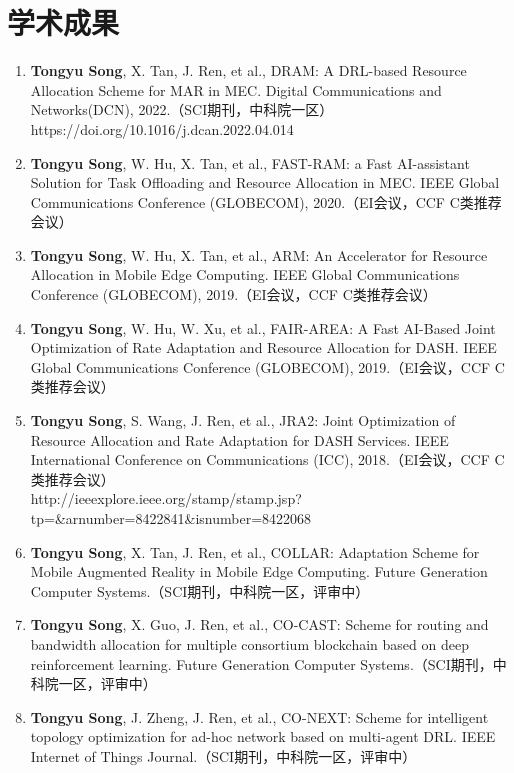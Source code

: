 \documentclass{resume}
\begin{document}
\section{学术成果}
\begin{enumerate}
  \item \textbf{Tongyu Song}, X. Tan, J. Ren, et al., DRAM: A DRL-based Resource Allocation Scheme for MAR in MEC.
  Digital Communications and Networks(DCN), 2022.（SCI期刊，中科院一区）
  \\https://doi.org/10.1016/j.dcan.2022.04.014
  \item \textbf{Tongyu Song}, W. Hu, X. Tan, et al., FAST-RAM: a Fast AI-assistant Solution for Task Offloading and Resource Allocation in MEC. IEEE Global Communications Conference (GLOBECOM), 2020.（EI会议，CCF C类推荐会议）
  \item \textbf{Tongyu Song}, W. Hu, X. Tan, et al., ARM: An Accelerator for Resource Allocation in Mobile Edge Computing. IEEE Global Communications Conference (GLOBECOM), 2019.（EI会议，CCF C类推荐会议）
  \item \textbf{Tongyu Song}, W. Hu, W. Xu, et al., FAIR-AREA: A Fast AI-Based Joint Optimization of Rate Adaptation and Resource Allocation for DASH. IEEE Global Communications Conference (GLOBECOM), 2019.（EI会议，CCF C类推荐会议）
  \item \textbf{Tongyu Song}, S. Wang, J. Ren, et al., JRA2: Joint Optimization of Resource Allocation and Rate Adaptation for DASH Services. IEEE International Conference on Communications (ICC), 2018.（EI会议，CCF C类推荐会议）
  \\http://ieeexplore.ieee.org/stamp/stamp.jsp?tp=\&arnumber=8422841\&isnumber=8422068
  \item \textbf{Tongyu Song}, X. Tan, J. Ren, et al., COLLAR: Adaptation Scheme for Mobile Augmented Reality in Mobile Edge Computing. Future Generation Computer Systems.（SCI期刊，中科院一区，评审中）
  \item\textbf{Tongyu Song}, X. Guo, J. Ren, et al., CO-CAST: Scheme for routing and bandwidth allocation for multiple consortium blockchain based on deep reinforcement learning. Future Generation Computer Systems.（SCI期刊，中科院一区，评审中）
  \item\textbf{Tongyu Song}, J. Zheng, J. Ren, et al., CO-NEXT: Scheme for intelligent topology optimization for ad-hoc network based on multi-agent DRL. IEEE Internet of Things Journal.（SCI期刊，中科院一区，评审中）
\end{enumerate}
\end{document}
